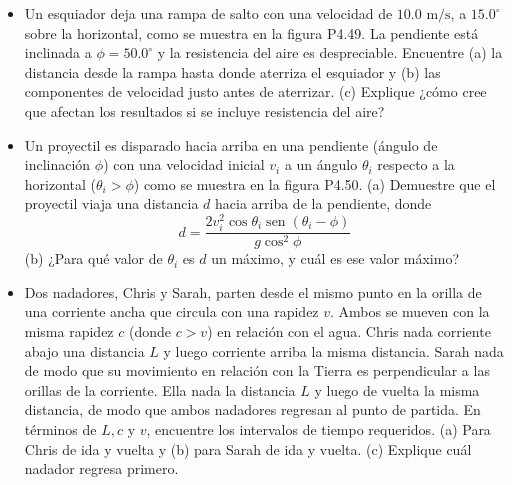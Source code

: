 \documentclass[11pt,a4paper]{article}
\begin{document}
\begin{itemize}
    \item[\textbf{49.}] Un esquiador deja una rampa de salto con una velocidad de $10.0 \text{ m/s}$, a $15.0^\circ$ sobre la horizontal, como se muestra en la figura P4.49. La pendiente está inclinada a $\phi = 50.0^\circ$ y la resistencia del aire es despreciable. Encuentre (a) la distancia desde la rampa hasta donde aterriza el esquiador y (b) las componentes de velocidad justo antes de aterrizar. (c) Explique ¿cómo cree que afectan los resultados si se incluye resistencia del aire?
    \vspace*{8cm}

    \item[\textbf{50.}] Un proyectil es disparado hacia arriba en una pendiente (ángulo de inclinación $\phi$) con una velocidad inicial $v_i$ a un ángulo $\theta_i$ respecto a la horizontal ($\theta_i > \phi$) como se muestra en la figura P4.50. (a) Demuestre que el proyectil viaja una distancia $d$ hacia arriba de la pendiente, donde
    $$ d = \frac{2v_i^2 \cos\theta_i \operatorname{sen}(\theta_i - \phi)}{g \cos^2\phi} $$
    (b) ¿Para qué valor de $\theta_i$ es $d$ un máximo, y cuál es ese valor máximo?
    \vspace*{8cm}

    \item[\textbf{51.}] Dos nadadores, Chris y Sarah, parten desde el mismo punto en la orilla de una corriente ancha que circula con una rapidez $v$. Ambos se mueven con la misma rapidez $c$ (donde $c > v$) en relación con el agua. Chris nada corriente abajo una distancia $L$ y luego corriente arriba la misma distancia. Sarah nada de modo que su movimiento en relación con la Tierra es perpendicular a las orillas de la corriente. Ella nada la distancia $L$ y luego de vuelta la misma distancia, de modo que ambos nadadores regresan al punto de partida. En términos de $L, c$ y $v$, encuentre los intervalos de tiempo requeridos. (a) Para Chris de ida y vuelta y (b) para Sarah de ida y vuelta. (c) Explique cuál nadador regresa primero.
    \vspace*{8cm}
\end{itemize}

\newpage
\end{document}
